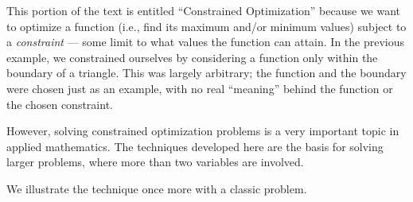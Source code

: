 This portion of the text is entitled ``Constrained Optimization'' because we want to optimize a function (i.e., find its maximum and/or minimum values) subject to a \emph{constraint} --- some limit to what values the function can attain. In the previous example, we constrained ourselves by considering a function only within the boundary of a triangle. This was largely arbitrary; the function and the boundary were chosen just as an example, with no real ``meaning'' behind the function or the chosen constraint.

However, solving constrained optimization problems is a very important topic in applied mathematics. The techniques developed here are the basis for solving larger problems, where more than two variables are involved.

We illustrate the technique once more with a classic problem.

